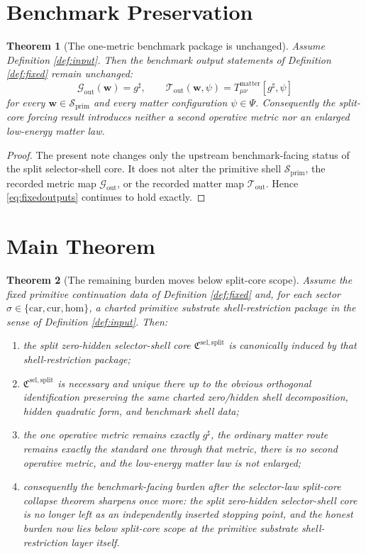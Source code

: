 \documentclass[11pt]{article}
\newcommand{\CompletedMetric}{g^{\sharp}}
\newcommand{\SelectorCore}{\mathfrak C^{\mathrm{sel,split}}}
\newcommand{\Car}{\mathrm{car}}
\newcommand{\Cur}{\mathrm{cur}}
\newcommand{\Hom}{\mathrm{hom}}
\newcommand{\PrimShell}{\mathcal S_{\mathrm{prim}}}
\newcommand{\MetricOut}{\mathscr G_{\mathrm{out}}}
\newcommand{\MatterOut}{\mathscr T_{\mathrm{out}}}
\newtheorem{theorem}{Theorem}
\begin{document}
\section{Benchmark Preservation}

\begin{theorem}[The one-metric benchmark package is unchanged]
\label{thm:outputs}
Assume Definition \ref{def:input}. Then the benchmark output statements of Definition \ref{def:fixed} remain unchanged:
\[
\MetricOut(\mathbf w)=\CompletedMetric,
\qquad
\MatterOut(\mathbf w,\psi)
=
T_{\mu\nu}^{\mathrm{matter}}[\CompletedMetric,\psi]
\]
for every \(\mathbf w\in\PrimShell\) and every matter configuration \(\psi\in\Psi\). Consequently the split-core forcing result introduces neither a second operative metric nor an enlarged low-energy matter law.
\end{theorem}

\begin{proof}
The present note changes only the upstream benchmark-facing status of the split selector-shell core. It does not alter the primitive shell \(\PrimShell\), the recorded metric map \(\MetricOut\), or the recorded matter map \(\MatterOut\). Hence \eqref{eq:fixedoutputs} continues to hold exactly.
\end{proof}

\section{Main Theorem}

\begin{theorem}[The remaining burden moves below split-core scope]
\label{thm:main}
Assume the fixed primitive continuation data of Definition \ref{def:fixed} and, for each sector \(\sigma\in\{\Car,\Cur,\Hom\}\), a charted primitive substrate shell-restriction package in the sense of Definition \ref{def:input}. Then:
\begin{enumerate}
    \item the split zero-hidden selector-shell core \(\SelectorCore\) is canonically induced by that shell-restriction package;
    \item \(\SelectorCore\) is necessary and unique there up to the obvious orthogonal identification preserving the same charted zero/hidden shell decomposition, hidden quadratic form, and benchmark shell data;
    \item the one operative metric remains exactly \(\CompletedMetric\), the ordinary matter route remains exactly the standard one through that metric, there is no second operative metric, and the low-energy matter law is not enlarged;
    \item consequently the benchmark-facing burden after the selector-law split-core collapse theorem sharpens once more: the split zero-hidden selector-shell core is no longer left as an independently inserted stopping point, and the honest burden now lies below split-core scope at the primitive substrate shell-restriction layer itself.
\end{enumerate}
\end{theorem}
\end{document}
